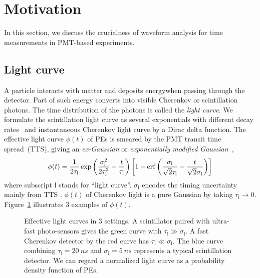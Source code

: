\section{Motivation}
\label{sec:toyMC}

In this section, we discuss the crucialness of waveform analysis for time measurements in PMT-based experiments.

\subsection{Light curve}
A particle interacts with matter and deposits energywhen passing through the detector. Part of such energy converts into visible Cherenkov or scintillation photons. The time distribution of the photons is called the \textit{light curve}.  We formulate the scintillation light curve as several exponentials with different decay rates~\cite{rebber_particle_2021} and instantaneous Cherenkov light curve by a Dirac delta function.  The effective light curve $\phi(t)$ of PEs is smeared by the PMT transit time spread~(TTS), giving an \textit{ex-Gaussian} or \textit{exponentially modified Gaussian}~\cite{li_separation_2016},
\begin{align}
    \phi(t) = \frac{1}{2\tau_\mathrm{l}} \exp\left(\frac{\sigma_\mathrm{l}^2}{2\tau_\mathrm{l}^2}-\frac{t}{\tau_\mathrm{l}}\right) \left[1 - \operatorname{erf}\left( \frac{\sigma_\mathrm{l}}{\sqrt{2}\tau_\mathrm{l}} - \frac{t}{\sqrt{2}\sigma_\mathrm{l}} \right)\right]
    \label{eq:time-pro}
\end{align}
where subscript $\mathrm{l}$ stands for ``light curve''.  $\sigma_\mathrm{l}$ encodes the timing uncertainty mainly from TTS . $\phi(t)$ of Cherenkov light is a pure Gaussian by taking $\tau_\mathrm{l} \rightarrow 0$. Figure~\ref{fig:time-pro} illustrates 3 examples of $\phi(t)$. 

\begin{figure}[!htb]
  \centering
  \resizebox{0.5\textwidth}{!}{}
  \caption{\label{fig:time-pro} Effective light curves in 3 settings.  A scintillator paired with ultra-fast photo-sensors gives the green curve with $\tau_\mathrm{l} \gg \sigma_\mathrm{l}$.  A fast Cherenkov detector by the red curve has $\tau_\mathrm{l} \ll \sigma_\mathrm{l}$.  The blue curve combining $\tau_\mathrm{l}=\SI{20}{ns}$ and $\sigma_\mathrm{l}=\SI{5}{ns}$ represents a typical scintillation detector.  We can regard a normalized light curve as a probability density function of PEs.}
\end{figure}


